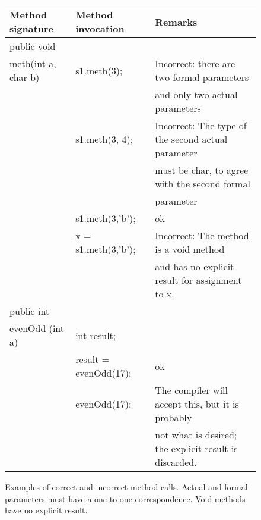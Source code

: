 




\begin {figure}

\begin {tabular} {l l l}
Method signature   
	&  Method invocation 
	& Remarks  				\\
\hline
public void &	&				\\
meth(int a, char b)
	& s1.meth(3);
	& Incorrect: there are two formal parameters \\
	 & &  and only two actual parameters 	\\ 
	& s1.meth(3, 4);
	& Incorrect: The type of the second actual parameter \\
	& &  must be char, to agree with the second formal  	\\
	& &  parameter			\\
	& s1.meth(3,'b');
	& ok					\\
	& x = s1.meth(3,'b');
	& Incorrect: The method is a void method \\
	& &  and has no explicit result for assignment
	  to x.					\\
public int 	&	&			\\
evenOdd (int a)
	&  int result;	&			\\
	&   result = evenOdd(17);
	&  ok					\\
	&  evenOdd(17);
	&  The compiler will accept this, but it is probably \\
	& &  not what is desired; the explicit
	   result is discarded.			\\
\end {tabular}
	   


\caption {Examples of correct and incorrect
method calls.  Actual and formal parameters
must have a one-to-one correspondence.
Void methods have no explicit result.}
\label {fig:parms}

\end {figure}


